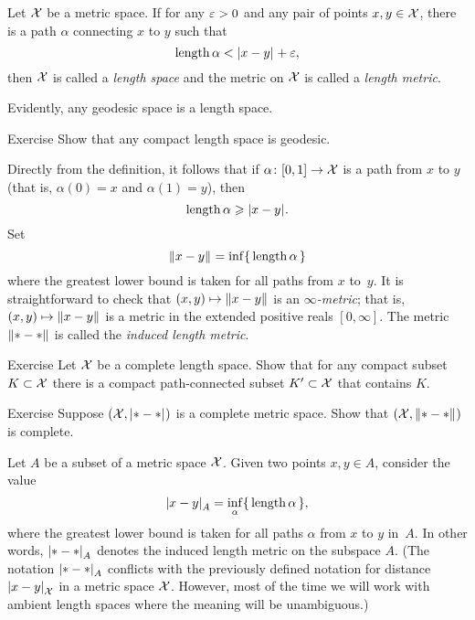 Let $\mathcal{X}$ be a metric space.
If for any $\varepsilon>0$ and any pair of points $x,y\in\mathcal{X}$, there is a path $\alpha$ connecting $x$ to $y$ such that
\[\length\alpha< \dist{x}{y}{}+\eps,\]
then $\mathcal{X}$ is called a \emph{length space} and the metric on $\mathcal{X}$ is called a \emph{length metric}.\label{page:length metric}

Evidently, any geodesic space is a length space.

\begin{thm}{Exercise}\label{ex:compact-length}
Show that any compact length space is geodesic.
\end{thm}


Directly from the definition, it follows that if $\alpha\colon[0,1]\to\mathcal{X}$ is a path from $x$ to $y$ 
(that is, $\alpha(0)=x$ and $\alpha(1)=y$), then 
\[\length\alpha\ge \dist{x}{y}{}.\]
Set 
\[\yetdist{x}{y}{}=\inf\{\,\length\alpha\,\}\]
where the greatest lower bound is taken for all paths from $x$ to~$y$.
It is straightforward to check that $(x,y)\mapsto \yetdist{x}{y}{}$ is an \emph{$\infty$-metric};
that is, $(x,y)\mapsto \yetdist{x}{y}{}$ is a metric in the extended positive reals $[0,\infty]$. 
The metric $\yetdist{*}{*}{}$ is called the \emph{induced length metric}.

\begin{thm}{Exercise}\label{ex:compact+connceted}
Let $\mathcal{X}$ be a complete length space.
Show that for any compact subset $K\subset\mathcal{X}$
there is a compact path-connected subset $K'\subset\mathcal{X}$ that contains $K$.  
\end{thm}

\begin{thm}{Exercise}\label{ex:compact=>complete}
Suppose $(\spc{X},\dist{*}{*}{})$ is a complete metric space.
Show that $(\spc{X},\yetdist{*}{*}{})$ is complete.
\end{thm}

Let $A$ be a subset of a metric space $\mathcal{X}$.
Given two points $x,y\in A$,
consider the value
\[\dist{x}{y}{A}=\inf_{\alpha}\{\,\length\alpha\,\},\]
where the greatest lower bound is taken for all paths $\alpha$ from $x$ to $y$ in~$A$.
In other words, $\dist{*}{*}{A}$ denotes the induced length metric on the subspace $A$.
(The notation $\dist{*}{*}{A}$ conflicts with the previously defined notation for distance $\dist{x}{y}{\spc{X}}$ in a metric space $\mathcal{X}$.
However, most of the time we will work with ambient length spaces where the meaning will be unambiguous.)

